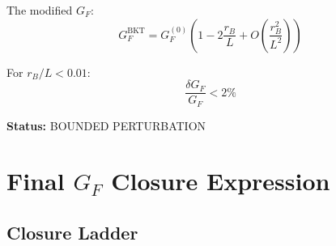 \documentclass[11pt,a4paper]{article}
\begin{document}
The modified $G_F$:
\begin{equation}
\label{eq:gf-bkt}
G_F^{\text{BKT}} = G_F^{(0)} \left(1 - 2\frac{r_B}{L} + O\left(\frac{r_B^2}{L^2}\right)\right)
\end{equation}

For $r_B/L < 0.01$:
\begin{equation}
\label{eq:gf-bkt-bound}
\frac{\delta G_F}{G_F} < 2\%
\end{equation}

\textbf{Status:} BOUNDED PERTURBATION

\section{Final $G_F$ Closure Expression}
\label{sec:gf-closure}

\subsection{Closure Ladder}
\label{subsec:closure-ladder}
\end{document}
